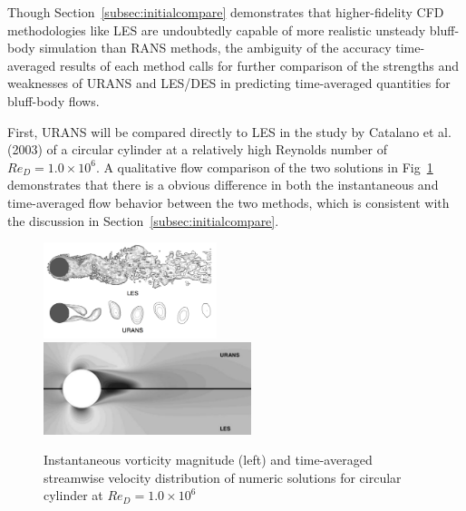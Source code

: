 \documentclass[journal]{new-aiaa}
\begin{document}
Though Section~\ref{subsec:initialcompare} demonstrates that higher-fidelity CFD methodologies like LES are undoubtedly capable of more realistic unsteady bluff-body simulation than RANS methods, the ambiguity of the accuracy time-averaged results of each method calls for further comparison of the strengths and weaknesses of URANS and LES/DES in predicting time-averaged quantities for bluff-body flows.

First, URANS will be compared directly to LES in the study by Catalano et al. (2003) \cite{catalano2003numerical} of a circular cylinder at a relatively high Reynolds number of $Re_D = 1.0 \times 10^6$. A qualitative flow comparison of the two solutions in Fig~\ref{fig:cylinderransvslesflow} demonstrates that there is a obvious difference in both the instantaneous and time-averaged flow behavior between the two methods, which is consistent with the discussion in Section~\ref{subsec:initialcompare}.



\begin{figure}[H]
\begin{center}
\includegraphics[width=0.45\textwidth]{Images/logan/catalano_2003numerical_UnsteadyURANSvsLES.pdf}
\includegraphics[width=0.54\textwidth]{Images/logan/catalano_2003numerical_SteadyURANSvsLES.pdf}
\caption{ Instantaneous vorticity magnitude (left) and time-averaged streamwise velocity distribution of numeric solutions for circular cylinder at $Re_D = 1.0 \times 10^6$ \cite{catalano2003numerical} }
\label{fig:cylinderransvslesflow}
\end{center}
\end{figure}
\end{document}
